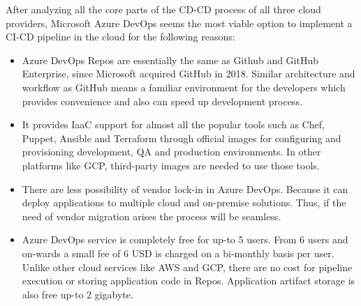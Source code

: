 After analyzing all the core parts of the CD-CD process of all three cloud providers, Microsoft Azure DevOps seems the most viable option to implement a CI-CD pipeline in the cloud for the following reasons: 

\begin{itemize}
    \item Azure DevOps Repos are essentially the same as Github and GitHub Enterprise, since Microsoft acquired GitHub in 2018. Similar architecture and workflow as GitHub means a familiar environment for the developers which provides convenience and also can speed up development process.
    \item It provides IaaC support for almost all the popular tools such as Chef, Puppet, Ansible and Terraform through official images for configuring and provisioning development, QA and production environments. In other platforms like GCP, third-party images are needed to use those tools.
    \item There are less possibility of vendor lock-in in Azure DevOps. Because it can deploy applications to multiple cloud and on-premise solutions. Thus, if the need of vendor migration arises the process will be seamless. 
    \item Azure DevOps service is completely free for up-to 5 users. From 6 users and on-wards a small fee of 6 USD is charged on a bi-monthly basis per user. Unlike other cloud services like AWS and GCP, there are no cost for pipeline execution or storing application code in Repos. Application artifact storage is also free up-to 2 gigabyte. 
\end{itemize}